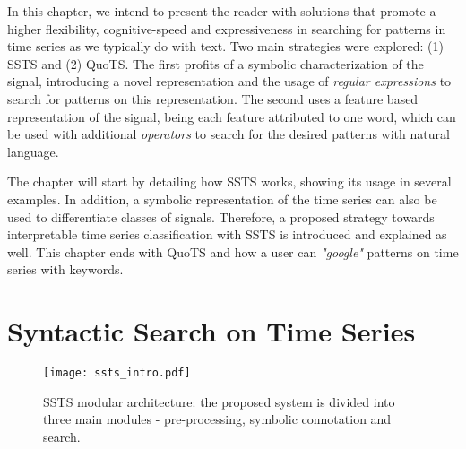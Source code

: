 \par
In this chapter, we intend to present the reader with solutions that promote a higher flexibility, cognitive-speed and expressiveness in searching for patterns in time series as we typically do with text. Two main strategies were explored: (1) \gls{SSTS} and (2) \gls{QuoTS}. The first profits of a symbolic characterization of the signal, introducing a novel representation and the usage of \textit{regular expressions} to search for patterns on this representation. The second uses a feature based representation of the signal, being each feature attributed to one word, which can be used with additional \textit{operators} to search for the desired patterns with natural language. 
\par
The chapter will start by detailing how \gls{SSTS} works, showing its usage in several examples. In addition, a symbolic representation of the time series can also be used to differentiate classes of signals. Therefore, a proposed strategy towards interpretable time series classification with \gls{SSTS} is introduced and explained as well. This chapter ends with \gls{QuoTS} and how a user can \textit{"google"} patterns on time series with keywords.







\section{Syntactic Search on Time Series}

\begin{figure}
\centering
\texttt{[image: ssts\_intro.pdf]}
\label{fig:ssts_intro}
\caption{SSTS modular architecture: the proposed system is divided into three main modules - pre-processing, symbolic connotation and search.}
\end{figure}

